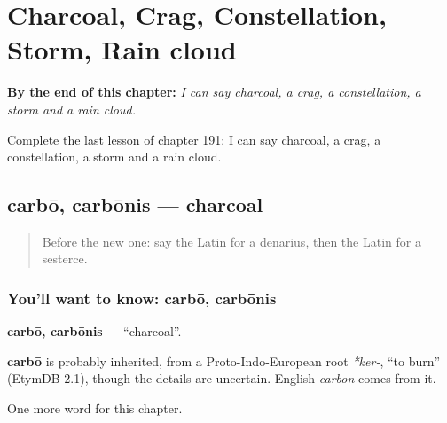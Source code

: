 
\chapter{Charcoal, Crag, Constellation, Storm, Rain cloud}
\label{ch:la-charcoal-crag-constellation-storm-rain-cloud}

\begin{chapteropening}
\textbf{By the end of this chapter:} \emph{I can say charcoal, a crag, a constellation, a storm and a rain cloud.}

Complete the last lesson of chapter 191: I can say charcoal, a crag, a constellation, a storm and a rain cloud.
\end{chapteropening}

\section[carbō, carbōnis]{carbō, carbōnis — charcoal}

\label{lesson:LA-C191-carbo}



\begin{quote}
Before the new one: say the Latin for a denarius, then the Latin for a sesterce.
\end{quote}

\subsection*{You'll want to know: carbō, carbōnis}
\textbf{carbō, carbōnis} — \textquotedblleft{}charcoal\textquotedblright{}.

\begin{cousinweb}
\textbf{carbō} is probably inherited, from a Proto-Indo-European root \emph{*ker-}, \textquotedblleft{}to burn\textquotedblright{} (EtymDB 2.1), though the details are uncertain. English \emph{carbon} comes from it.
\end{cousinweb}

\begin{grammarlens}[title={What you've built}]
One more word for this chapter.
\end{grammarlens}

